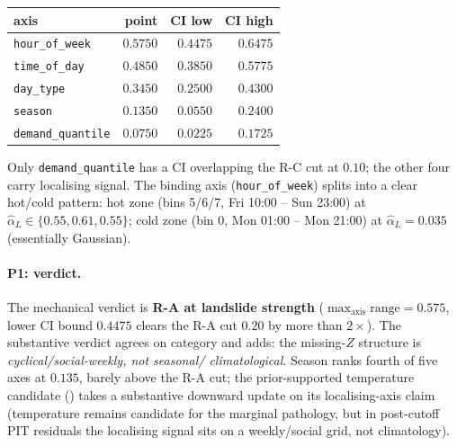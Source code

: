 \documentclass[11pt]{article}
\theoremstyle{definition}
\theoremstyle{plain}
\begin{document}
\begin{center}
\begin{tabular}{lrrr}
\toprule
axis & point & CI low & CI high \\
\midrule
\texttt{hour\_of\_week}    & $0.5750$ & $0.4475$ & $0.6475$ \\
\texttt{time\_of\_day}     & $0.4850$ & $0.3850$ & $0.5775$ \\
\texttt{day\_type}         & $0.3450$ & $0.2500$ & $0.4300$ \\
\texttt{season}            & $0.1350$ & $0.0550$ & $0.2400$ \\
\texttt{demand\_quantile}  & $0.0750$ & $0.0225$ & $0.1725$ \\
\bottomrule
\end{tabular}
\end{center}

Only \texttt{demand\_quantile} has a CI overlapping the R-C cut at
$0.10$; the other four carry localising signal. The binding axis
(\texttt{hour\_of\_week}) splits into a clear hot/cold pattern:
hot zone (bins 5/6/7, Fri 10:00 -- Sun 23:00) at
$\hat\alpha_L \in \{0.55, 0.61, 0.55\}$; cold zone (bin 0, Mon
01:00 -- Mon 21:00) at $\hat\alpha_L = 0.035$ (essentially Gaussian).

\paragraph{P1: verdict.}
The mechanical verdict is \textbf{R-A at landslide strength}
($\max_{\mathrm{axis}}\mathrm{range} = 0.575$, lower CI bound
$0.4475$ clears the R-A cut $0.20$ by more than $2\times$). The
substantive verdict agrees on category and adds: the missing-$Z$
structure is \emph{cyclical/social-weekly, not seasonal/
climatological}. Season ranks fourth of five axes at $0.135$,
barely above the R-A cut; the prior-supported temperature candidate
() takes a substantive downward
update on its localising-axis claim (temperature remains candidate
for the marginal pathology, but in post-cutoff PIT residuals the
localising signal sits on a weekly/social grid, not climatology).
\end{document}
